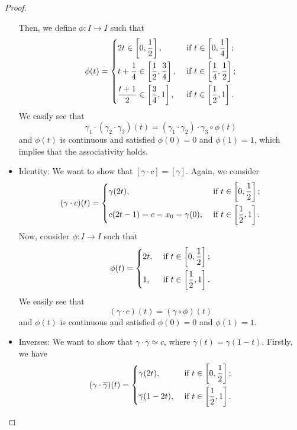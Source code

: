 \begin{proof}
\begin{itemize}
		      \par Then, we define \(\phi \colon I\to I\) such that
		      \[
			      \phi (t) = \begin{dcases}
				      2t\in\left[0, \frac{1}{2}\right],                      & \text{ if }  t\in\left[0, \frac{1}{4}\right];           \\
				      t+\frac{1}{4}\in\left[\frac{1}{2}, \frac{3}{4}\right], & \text{ if }  t\in\left[\frac{1}{4}, \frac{1}{2}\right]; \\
				      \frac{t+1}{2}\in\left[\frac{3}{4}, 1\right],           & \text{ if }  t\in\left[\frac{1}{2}, 1\right].
			      \end{dcases}
		      \]
		      We easily see that
		      \[
			      \gamma_1\cdot(\gamma_2\cdot \gamma_3)(t) = (\gamma_1\cdot\gamma_2)\cdot \gamma_{3}\circ \phi (t)
		      \]
		      and \(\phi (t)\) is continuous and satisfied \(\phi (0) = 0\) and \(\phi (1) = 1\), which implies that the associativity holds.
		\item Identity: We want to show that \([\gamma\cdot c] = [\gamma]\). Again, we consider
		      \[
			      (\gamma\cdot c) (t) = \begin{dcases}
				      \gamma(2t),                    & \text{ if } t\in\left[0, \frac{1}{2}\right] ; \\
				      c(2t-1) = c = x_0 = \gamma(0), & \text{ if } t\in\left[\frac{1}{2}, 1\right].
			      \end{dcases}
		      \]
		      Now, consider \(\phi \colon I\to I\) such that
		      \[
			      \phi (t) = \begin{dcases}
				      2t, & \text{ if } t\in\left[0, \frac{1}{2}\right] ; \\
				      1,  & \text{ if }  t\in\left[\frac{1}{2}, 1\right].
			      \end{dcases}
		      \]
		      We easily see that
		      \[
			      (\gamma\cdot c)(t) = (\gamma\circ \phi) (t)
		      \]
		      and \(\phi (t)\) is continuous and satisfied \(\phi (0) = 0\) and \(\phi (1) = 1\).
		\item Inverses: We want to show that \(\gamma\cdot \overline{\gamma} \simeq c\), where \(\overline{\gamma} (t) = \gamma(1-t)\).
		      Firstly, we have
		      \[
			      (\gamma\cdot \overline{\gamma})(t) = \begin{dcases}
				      \gamma(2t),               & \text{ if }  t\in\left[0, \frac{1}{2}\right]; \\
				      \overline{\gamma} (1-2t), & \text{ if }  t\in\left[\frac{1}{2}, 1\right].
			      \end{dcases}
		      \]


\end{itemize}
\end{proof}
